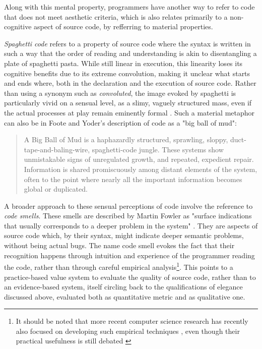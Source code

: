 Along with this mental property, programmers have another way to refer to code that does not meet aesthetic criteria, which is also relates primarily to a non-cognitive aspect of source code, by refferring to material properties.

\emph{Spaghetti code} refers to a property of source code where the syntax is written in such a way that the order of reading and understanding is akin to disentangling a plate of spaghetti pasta. While still linear in execution, this linearity loses its cognitive benefits due to its extreme convolution, making it unclear what starts and ends where, both in the declaration and the execution of source code. Rather than using a synonym such as \emph{convoluted}, the image evoked by spaghetti is particularly vivid on a sensual level, as a slimy, vaguely structured mass, even if the actual processes at play remain eminently formal \citep{steele_macaroni_1977}. Such a material metaphor can also be in Foote and Yoder's description of code as a "big ball of mud":

\begin{quote}
  A Big Ball of Mud is a haphazardly structured, sprawling, sloppy, duct-tape-and-baling-wire, spaghetti-code jungle. These systems show unmistakable signs of unregulated growth, and repeated, expedient repair. Information is shared promiscuously among distant elements of the system, often to the point where nearly all the important information becomes global or duplicated. \citep{foote_big_1997}
\end{quote}

A broader approach to these sensual perceptions of code involve the reference to \emph{code smells}. These smells are described by Martin Fowler as "surface indications that usually corresponds to a deeper problem in the system" \citep{fowler_refactoring_1999}. They are aspects of source code which, by their syntax, might indicate deeper semantic problems, without being actual bugs. The name code smell evokes the fact that their recognition happens through intuition and experience of the programmer reading the code, rather than through careful empirical analysis\footnote{It should be noted that more recent computer science research has recently also focused on developing such empirical techniques \citep{rasool_review_2015}, even though their practical usefulness is still debated \citep{santos_systematic_2018}}. This points to a practice-based value system to evaluate the quality of source code, rather than to an evidence-based system, itself circling back to the qualifications of elegance discussed above, evaluated both as quantitative metric and as qualitative one.

